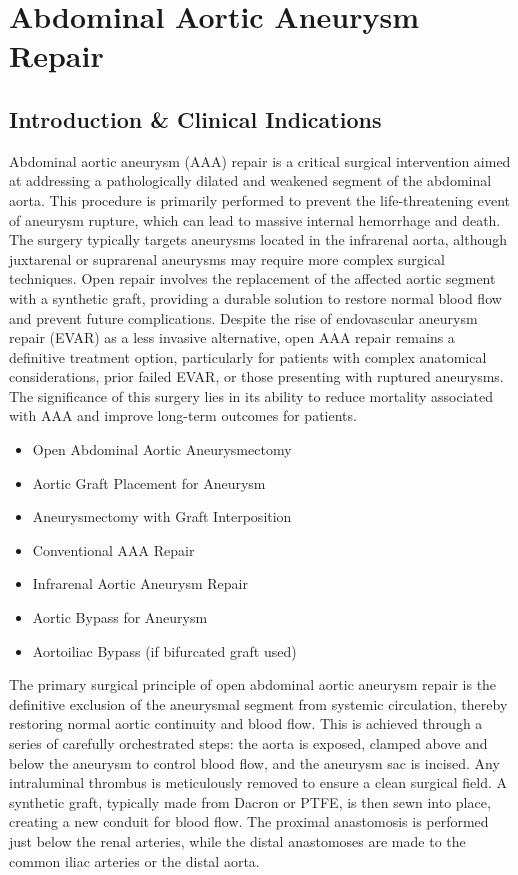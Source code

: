 \chapter{Abdominal Aortic Aneurysm Repair}

\section*{Introduction \& Clinical Indications}
Abdominal aortic aneurysm (AAA) repair is a critical surgical intervention aimed at addressing a pathologically dilated and weakened segment of the abdominal aorta. This procedure is primarily performed to prevent the life-threatening event of aneurysm rupture, which can lead to massive internal hemorrhage and death. The surgery typically targets aneurysms located in the infrarenal aorta, although juxtarenal or suprarenal aneurysms may require more complex surgical techniques. Open repair involves the replacement of the affected aortic segment with a synthetic graft, providing a durable solution to restore normal blood flow and prevent future complications. Despite the rise of endovascular aneurysm repair (EVAR) as a less invasive alternative, open AAA repair remains a definitive treatment option, particularly for patients with complex anatomical considerations, prior failed EVAR, or those presenting with ruptured aneurysms. The significance of this surgery lies in its ability to reduce mortality associated with AAA and improve long-term outcomes for patients.

\begin{itemize}
  \item Open Abdominal Aortic Aneurysmectomy
  \item Aortic Graft Placement for Aneurysm
  \item Aneurysmectomy with Graft Interposition
  \item Conventional AAA Repair
  \item Infrarenal Aortic Aneurysm Repair
  \item Aortic Bypass for Aneurysm
  \item Aortoiliac Bypass (if bifurcated graft used)
\end{itemize}

The primary surgical principle of open abdominal aortic aneurysm repair is the definitive exclusion of the aneurysmal segment from systemic circulation, thereby restoring normal aortic continuity and blood flow. This is achieved through a series of carefully orchestrated steps: the aorta is exposed, clamped above and below the aneurysm to control blood flow, and the aneurysm sac is incised. Any intraluminal thrombus is meticulously removed to ensure a clean surgical field. A synthetic graft, typically made from Dacron or PTFE, is then sewn into place, creating a new conduit for blood flow. The proximal anastomosis is performed just below the renal arteries, while the distal anastomoses are made to the common iliac arteries or the distal aorta.

